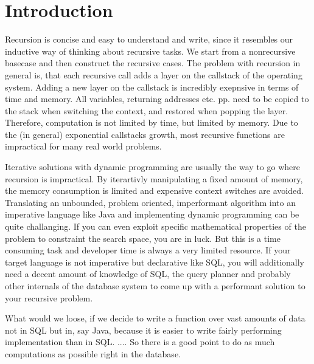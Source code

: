\chapter{Introduction}\label{Introduction}


Recursion is concise and easy to understand and write, since it resembles our inductive way of thinking about recursive tasks. We start from a nonrecursive basecase and then construct the recursive cases. The problem with recursion in general is, that each recursive call adds a layer on the callstack of the operating system. Adding a new layer on the callstack is incredibly exepnsive in terms of time and memory. All variables, returning addresses etc. pp. need to be copied to the stack when switching the context, and restored when popping the layer. Therefore, computation is not limited by time, but limited by memory. Due to the (in general) exponential callstacks growth, most recursive functions are impractical for many real world problems.

Iterative solutions with dynamic programming are usually the way to go where recursion is impractical. By iterartivly manipulating a fixed amount of memory, the memory consumption is limited and expensive context switches are avoided. Translating an unbounded, problem oriented, imperformant algorithm into an imperative language like Java and implementing dynamic programming can be quite challanging. If you can even exploit specific mathematical properties of the problem to constraint the search space, you are in luck. But this is a time consuming task and developer time is always a very limited resource. If your target language is not imperative but declarative like SQL, you will additionally need a decent amount of knowledge of SQL, the query planner and probably other internals of the database system to come up with a performant solution to your recursive problem.

What would we loose, if we decide to write a function over vast amounts of data not in SQL but in, say Java, because it is easier to write fairly performing implementation than in SQL.
....
So there is a good point to do as much computations as possible right in the database.




